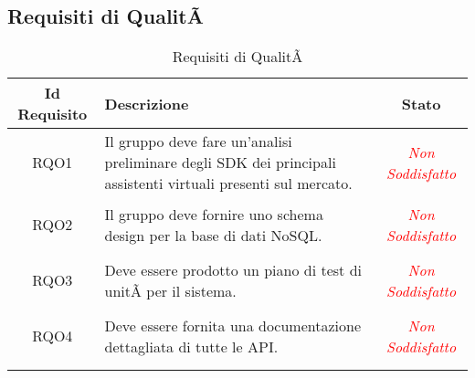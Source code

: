 \subsection{Requisiti di QualitÃ }
\normalsize
\begin{longtable}{|c|>{\centering}m{7cm}|c|}
\hline 
\textbf{Id Requisito} & \textbf{Descrizione} & \textbf{Stato}\\
\hline
\endhead
\hypertarget{RQO1}{RQO1} & Il gruppo deve fare un'analisi preliminare degli SDK dei principali assistenti virtuali presenti sul mercato. & \textcolor{red}{\textit{Non Soddisfatto}}\\ \hline

\hypertarget{RQO2}{RQO2} & Il gruppo deve fornire uno schema design per la base di dati NoSQL.
 & \textcolor{red}{\textit{Non Soddisfatto}}\\ \hline

\hypertarget{RQO3}{RQO3} & Deve essere prodotto un piano di test di unitÃ  per il sistema. & \textcolor{red}{\textit{Non Soddisfatto}}\\ \hline

\hypertarget{RQO4}{RQO4} & Deve essere fornita una documentazione dettagliata di tutte le API. & \textcolor{red}{\textit{Non Soddisfatto}}\\ \hline

\caption[Requisiti di QualitÃ ]{Requisiti di QualitÃ }
\label{tabella:req2}
\end{longtable}
\clearpage
